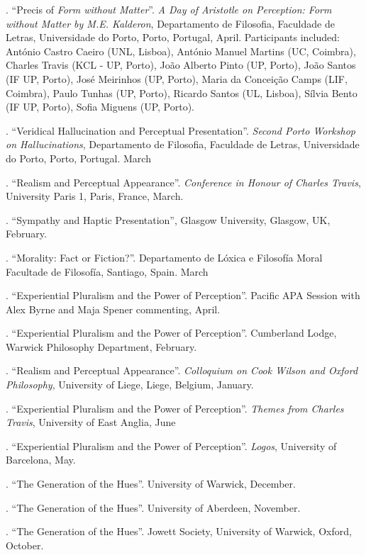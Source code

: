\documentclass[11pt]{article}
\begin{document}
. ``Precis of \emph{Form without Matter}''. \emph{A Day of Aristotle on Perception: Form without Matter by M.E. Kalderon}, Departamento de Filosofia, Faculdade de Letras, Universidade do Porto, Porto, Portugal, April. Participants included: António Castro Caeiro (UNL, Lisboa), António Manuel Martins (UC, Coimbra), Charles Travis (KCL - UP, Porto), João Alberto Pinto (UP, Porto), João Santos (IF UP, Porto), José Meirinhos (UP, Porto), Maria da Conceição Camps (LIF, Coimbra), Paulo Tunhas (UP, Porto), Ricardo Santos (UL, Lisboa), Sílvia Bento (IF UP, Porto), Sofia Miguens (UP, Porto).

. ``Veridical Hallucination and Perceptual Presentation''. \emph{Second Porto Workshop on Hallucinations}, Departamento de Filosofia, Faculdade de Letras, Universidade do Porto, Porto, Portugal. March

. ``Realism and Perceptual Appearance''. \emph{Conference in Honour of Charles Travis}, University Paris 1, Paris, France, March.

. ``Sympathy and Haptic Presentation'', Glasgow University, Glasgow, UK, February.

. ``Morality: Fact or Fiction?''. Departamento de Lóxica e Filosofía Moral
Facultade de Filosofía, Santiago, Spain. March

. ``Experiential Pluralism and the Power of Perception''. Pacific APA Session with Alex Byrne and Maja Spener commenting, April.

. ``Experiential Pluralism and the Power of Perception''. Cumberland Lodge, Warwick Philosophy Department, February.

. ``Realism and Perceptual Appearance''. \emph{Colloquium on Cook Wilson and Oxford Philosophy}, University of Liege, Liege, Belgium, January.

. ``Experiential Pluralism and the Power of Perception''. \emph{Themes from Charles Travis}, University of East Anglia, June

. ``Experiential Pluralism and the Power of Perception''. \emph{Logos}, University of Barcelona, May.

. ``The Generation of the Hues''. University of Warwick, December.

. ``The Generation of the Hues''. University of Aberdeen, November.

. ``The Generation of the Hues''. Jowett Society, University of Warwick, Oxford, October.
\end{document}
